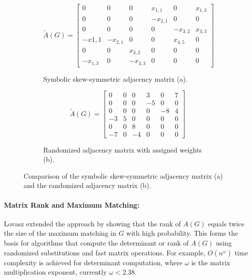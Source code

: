 \begin{figure}[h]
    \centering
    \begin{subfigure}[b]{0.4\textwidth}
        \centering
        \[
        \tilde{A}(G) =
        \begin{bmatrix}
        0 & 0 & 0 & x_{1,1} & 0 & x_{1,3} \\
        0 & 0 & 0 & -x_{2,1} & 0 & 0 \\
        0 & 0 & 0 & 0 & -x_{3,2} & x_{3,3} \\
        -x{1,1} & -x_{2,1} & 0 & 0 & x_{4,5} & 0 \\
        0 & 0 & x_{3,2} & 0 & 0 & 0 \\
        -x_{1,3} & 0 & -x_{3,3} & 0 & 0 & 0
        \end{bmatrix}
        \]
        \caption{Symbolic skew-symmetric adjacency matrix (a).}
    \end{subfigure}
    \hfill
    \begin{subfigure}[b]{0.4\textwidth}
        \centering
        \[
        \tilde{A}(G) =
        \begin{bmatrix}
        0 & 0 & 0 & 3 & 0 & 7 \\
        0 & 0 & 0 & -5 & 0 & 0 \\
        0 & 0 & 0 & 0 & -8 & 4 \\
        -3 & 5 & 0 & 0 & 0 & 0 \\
        0 & 0 & 8 & 0 & 0 & 0 \\
        -7 & 0 & -4 & 0 & 0 & 0
        \end{bmatrix}
        \]
        \caption{Randomized adjacency matrix with assigned weights (b).}
    \end{subfigure}
    \caption{Comparison of the symbolic skew-symmetric adjacency matrix (a) and the randomized adjacency matrix (b).}
    \label{fig:matrices}
\end{figure}

\paragraph*{Matrix Rank and Maximum Matching:}
Lovasz extended the approach by showing that the rank of \( A(G) \) equals twice the size of the maximum matching in \( G \) with high probability. This forms the basis for algorithms that compute the determinant or rank of \( A(G) \) using randomized substitutions and fast matrix operations. For example, \( O(n^\omega) \) time complexity is achieved for determinant computation, where \( \omega \) is the matrix multiplication exponent, currently \( \omega < 2.38 \).

